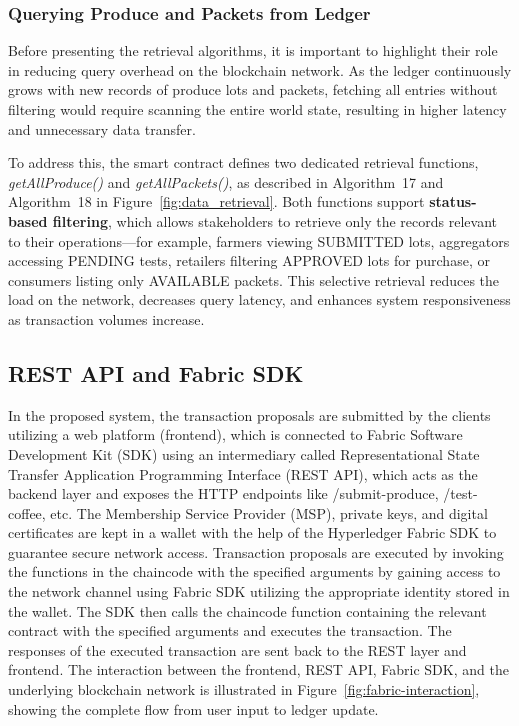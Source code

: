 \documentclass[12pt]{article}
\begin{document}
	
	\subsubsection{Querying Produce and Packets from Ledger}
	
	Before presenting the retrieval algorithms, it is important to highlight their role in reducing query overhead on the blockchain network. As the ledger continuously grows with new records of produce lots and packets, fetching all entries without filtering would require scanning the entire world state, resulting in higher latency and unnecessary data transfer.
	
	To address this, the smart contract defines two dedicated retrieval functions, \textit{getAllProduce()} and \textit{getAllPackets()}, as described in Algorithm~17 and Algorithm~18 in Figure~\ref{fig:data_retrieval}. Both functions support \textbf{status-based filtering}, which allows stakeholders to retrieve only the records relevant to their operations—for example, farmers viewing SUBMITTED lots, aggregators accessing PENDING tests, retailers filtering APPROVED lots for purchase, or consumers listing only AVAILABLE packets. This selective retrieval reduces the load on the network, decreases query latency, and enhances system responsiveness as transaction volumes increase.
	
	
	
	

	
	
	
	
	
	\subsection{ REST API and Fabric SDK}
	
	In the proposed system, the transaction proposals are submitted by the clients utilizing a web platform (frontend), which is connected to Fabric Software Development Kit (SDK) using an intermediary called Representational State Transfer Application Programming Interface (REST API), which acts as the backend layer and exposes the HTTP endpoints like /submit-produce, /test-coffee, etc. The Membership Service Provider (MSP), private keys, and digital certificates are kept in a wallet with the help of the Hyperledger Fabric SDK to guarantee secure network access. Transaction proposals are executed by invoking the functions in the chaincode with the specified arguments by gaining access to the network channel using Fabric SDK utilizing the appropriate identity stored in the wallet. The SDK then calls the chaincode function containing the relevant contract with the specified arguments and executes the transaction. The responses of the executed transaction are sent back to the REST layer and frontend. The interaction between the frontend, REST API, Fabric SDK, and the underlying blockchain network is illustrated in Figure~\ref{fig:fabric-interaction}, showing the complete flow from user input to ledger update.
	
\end{document}
